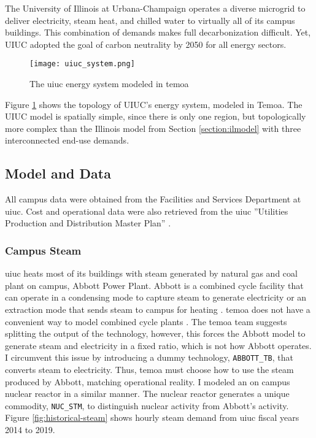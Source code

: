 
The University of Illinois at Urbana-Champaign operates a diverse microgrid to
deliver electricity, steam heat, and chilled water to virtually all of its
campus buildings. This combination of demands makes full decarbonization difficult.
Yet, UIUC adopted the goal of carbon neutrality by 2050 for all energy sectors.

\begin{figure}[H]
  \texttt{[image: uiuc\_system.png]}
  \caption{The \gls{uiuc} energy system modeled in \gls{temoa}}
  \label{fig:uiucsys}
\end{figure}

Figure \ref{fig:uiucsys} shows the topology of UIUC’s energy system, modeled in Temoa.
The UIUC model is spatially simple, since there is only one region, but topologically
more complex than the Illinois model from Section \ref{section:ilmodel} with
three interconnected end-use demands.

\subsection{Model and Data}
All campus data were obtained from the Facilities and Services Department at \gls{uiuc}.
Cost and operational data were also retrieved from the \gls{uiuc} ''Utilities
Production and Distribution Master Plan'' \cite{affiliated_engineers_inc_utilities_2015}.

\subsubsection{Campus Steam}
\gls{uiuc} heats most of its buildings with steam generated by natural gas and
coal plant on campus, Abbott Power Plant. Abbott is a combined cycle facility that
can operate in a condensing mode to capture steam to generate electricity or an
extraction mode that sends steam to campus for heating
\cite{affiliated_engineers_inc_utilities_2015}. \gls{temoa} does not have a
convenient way to model combined cycle plants \cite{decarolis_temoa_2010}. The
\gls{temoa} team suggests splitting the output of the technology, however, this
forces the Abbott model to generate steam and electricity in a fixed ratio, which
is not how Abbott operates. I circumvent this issue by introducing a dummy technology,
\texttt{ABBOTT\_TB}, that converts steam to electricity. Thus, \gls{temoa} must
choose how to use the steam produced by Abbott, matching operational reality.
I modeled an on campus nuclear reactor in a similar manner. The nuclear reactor
generates a unique commodity, \texttt{NUC\_STM}, to distinguish nuclear activity
from Abbott's activity. Figure \ref{fig:historical-steam} shows hourly steam
demand from \gls{uiuc} fiscal years 2014 to 2019.

